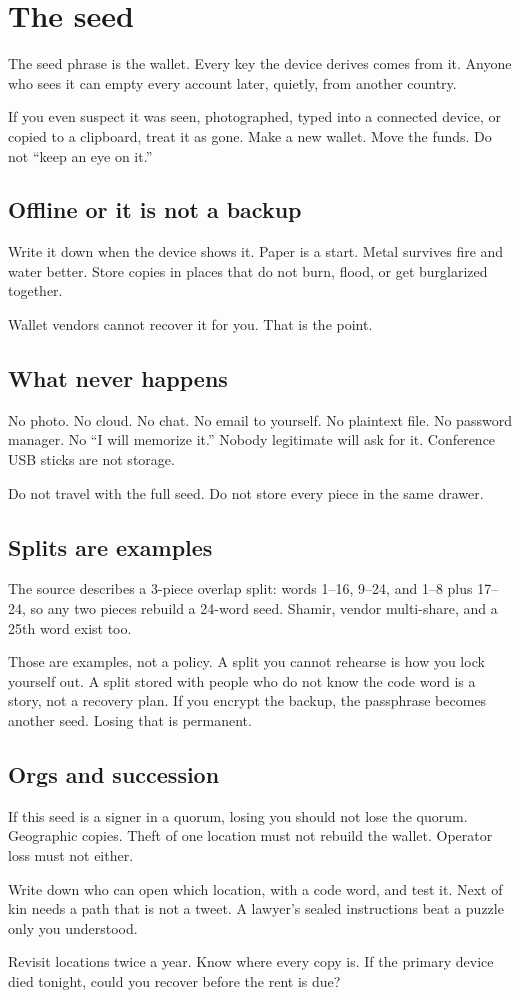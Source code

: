 \chapter{The seed}

The seed phrase is the wallet. Every key the device
derives comes from it. Anyone who sees it can empty
every account later, quietly, from another country.

If you even suspect it was seen, photographed, typed
into a connected device, or copied to a clipboard, treat
it as gone. Make a new wallet. Move the funds. Do not
``keep an eye on it.''

\section{Offline or it is not a backup}

Write it down when the device shows it. Paper is a
start. Metal survives fire and water better. Store
copies in places that do not burn, flood, or get
burglarized together.

Wallet vendors cannot recover it for you. That is the
point.

\section{What never happens}

No photo. No cloud. No chat. No email to yourself. No
plaintext file. No password manager. No ``I will
memorize it.'' Nobody legitimate will ask for it.
Conference USB sticks are not storage.

Do not travel with the full seed. Do not store every
piece in the same drawer.

\section{Splits are examples}

The source describes a 3-piece overlap split: words
1--16, 9--24, and 1--8 plus 17--24, so any two pieces
rebuild a 24-word seed. Shamir, vendor multi-share, and
a 25th word exist too.

Those are examples, not a policy. A split you cannot
rehearse is how you lock yourself out. A split stored
with people who do not know the code word is a story,
not a recovery plan. If you encrypt the backup, the
passphrase becomes another seed. Losing that is
permanent.

\section{Orgs and succession}

If this seed is a signer in a quorum, losing you should
not lose the quorum. Geographic copies. Theft of one
location must not rebuild the wallet. Operator loss must
not either.

Write down who can open which location, with a code
word, and test it. Next of kin needs a path that is not
a tweet. A lawyer's sealed instructions beat a puzzle
only you understood.

Revisit locations twice a year. Know where every copy
is. If the primary device died tonight, could you
recover before the rent is due?
